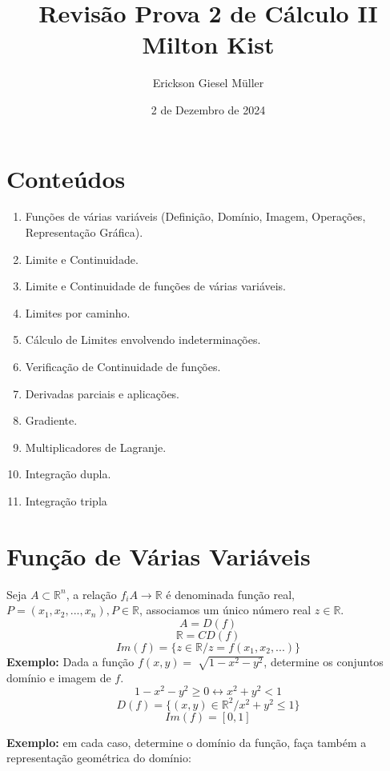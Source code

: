 \documentclass{article}
\title{Revisão Prova 2 de Cálculo II\\Milton Kist}
\author{Erickson Giesel Müller}
\date{2 de Dezembro de 2024}
\begin{document}
	\maketitle
	
	\section*{Conteúdos}
		\begin{enumerate}
			\item Funções de várias variáveis (Definição, Domínio, Imagem, Operações, Representação Gráfica).
			\item Limite e Continuidade.
			\item Limite e Continuidade de funções de várias variáveis.
			\item Limites por caminho.
			\item Cálculo de Limites envolvendo indeterminações.
			\item Verificação de Continuidade de funções.
			\item Derivadas parciais e aplicações.
			\item Gradiente.
			\item Multiplicadores de Lagranje.
			\item Integração dupla.
			\item Integração tripla
			
		\end{enumerate}
	\newpage
	
	\section{Função de Várias Variáveis}
		Seja $A\subset \mathbb{R}^n$, a relação $f_i A \to \mathbb{R}$ é denominada função real, $P=(x_1,x_2,...,x_n), P\in \mathbb{R}$, associamos um único número real $z \in \mathbb{R}$.
		$$A=D(f)$$
		$$\mathbb{R}=CD(f)$$
		$$Im(f)=\{z \in \mathbb{R}/z=f(x_1,x_2,...)\}$$
		\textbf{Exemplo:} Dada a função $f(x,y)=\sqrt[]{1-x^2-y^2}$, determine os conjuntos domínio e imagem de $f$.
		$$1-x^2-y^2 \geq 0 \leftrightarrow x^2+y^2 < 1$$
		$$D(f) = \{(x,y) \in \mathbb{R}^2/x^2+y^2\leq 1\}$$
		$$Im(f)=[0,1]$$
		
		\textbf{Exemplo:} em cada caso, determine o domínio da função, faça também a representação geométrica do domínio:
	
\end{document}

